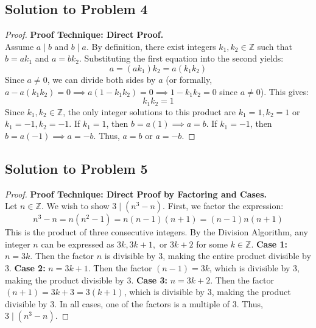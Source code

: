 \documentclass[12pt]{article}
\begin{document}
\subsection{Solution to Problem 4}
\begin{proof}
\textbf{Proof Technique: Direct Proof.} \\
Assume $a \mid b$ and $b \mid a$. By definition, there exist integers $k_1, k_2 \in \mathbb{Z}$ such that $b = ak_1$ and $a = bk_2$. Substituting the first equation into the second yields:
\[ a = (ak_1)k_2 = a(k_1 k_2) \]
Since $a \neq 0$, we can divide both sides by $a$ (or formally, $a - a(k_1 k_2) = 0 \implies a(1 - k_1 k_2) = 0 \implies 1 - k_1 k_2 = 0$ since $a \neq 0$). This gives:
\[ k_1 k_2 = 1 \]
Since $k_1, k_2 \in \mathbb{Z}$, the only integer solutions to this product are $k_1 = 1, k_2 = 1$ or $k_1 = -1, k_2 = -1$. 
If $k_1 = 1$, then $b = a(1) \implies a = b$. 
If $k_1 = -1$, then $b = a(-1) \implies a = -b$. 
Thus, $a = b$ or $a = -b$.
\end{proof}

\subsection{Solution to Problem 5}
\begin{proof}
\textbf{Proof Technique: Direct Proof by Factoring and Cases.} \\
Let $n \in \mathbb{Z}$. We wish to show $3 \mid (n^3 - n)$. First, we factor the expression:
\[ n^3 - n = n(n^2 - 1) = n(n - 1)(n + 1) = (n - 1)n(n + 1) \]
This is the product of three consecutive integers. By the Division Algorithm, any integer $n$ can be expressed as $3k, 3k+1,$ or $3k+2$ for some $k \in \mathbb{Z}$.
\textbf{Case 1:} $n = 3k$. Then the factor $n$ is divisible by 3, making the entire product divisible by 3.
\textbf{Case 2:} $n = 3k + 1$. Then the factor $(n - 1) = 3k$, which is divisible by 3, making the product divisible by 3.
\textbf{Case 3:} $n = 3k + 2$. Then the factor $(n + 1) = 3k + 3 = 3(k + 1)$, which is divisible by 3, making the product divisible by 3.
In all cases, one of the factors is a multiple of 3. Thus, $3 \mid (n^3 - n)$.
\end{proof}
\end{document}
